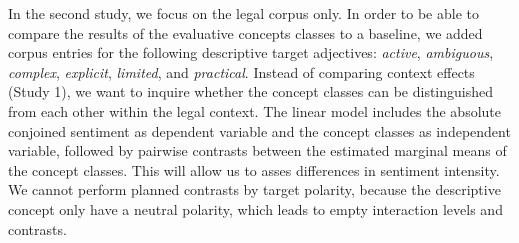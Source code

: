 \documentclass{article}
\begin{document}
In the second study, we focus on the legal corpus only. In order to be able to compare the results of the evaluative concepts classes to a baseline, we added corpus entries for the following descriptive target adjectives: \textit{active}, \textit{ambiguous}, \textit{complex}, \textit{explicit}, \textit{limited}, and \textit{practical}. Instead of comparing context effects (Study 1), we want to inquire whether the concept classes can be distinguished from each other within the legal context. The linear model includes the absolute conjoined sentiment as dependent variable and the concept classes as independent variable, followed by pairwise contrasts between the estimated marginal means of the concept classes. This will allow us to asses differences in sentiment intensity. 
We cannot perform planned contrasts by target polarity, because the descriptive concept only have a neutral polarity, which leads to empty interaction levels and contrasts. %


\end{document}
